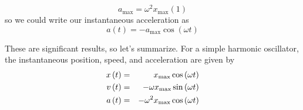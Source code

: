\documentclass{book}
\begin{document}
\begin{equation}
a_{\max }=\omega ^{2}x_{\max }\left( 1\right)
\end{equation}%
so we could write our instantaneous acceleration as 
\begin{equation*}
a\left( t\right) =-a_{\max }\cos \left( \omega t\right)
\end{equation*}

These are significant results, so let's summarize. For a simple harmonic
oscillator, the instantaneous position, speed, and acceleration are given by%
\begin{eqnarray}
x\left( t\right) &=&x_{\max }\cos \left( \omega t\right) \\
v\left( t\right) &=&-\omega x_{\max }\sin \left( \omega t\right)  \notag \\
a\left( t\right) &=&-\omega ^{2}x_{\max }\cos \left( \omega t\right)  \notag
\end{eqnarray}
\end{document}
